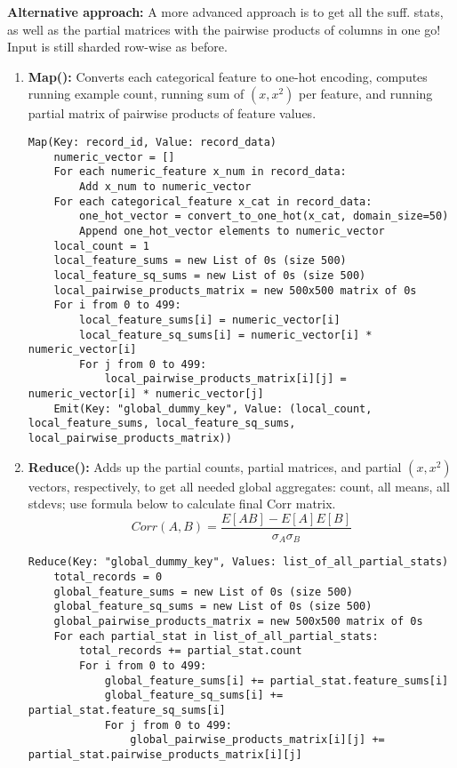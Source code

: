 \documentclass{article}
\begin{document}
\begin{enumerate}[label=\textbf{Question \arabic*.}]
    \textbf{Alternative approach:}
    A more advanced approach is to get all the suff. stats, as well as the partial matrices with the pairwise products of columns in one go! Input is still sharded row-wise as before.
    \begin{enumerate}[label=(\alph*)]
    \item \textbf{Map():} Converts each categorical feature to one-hot encoding, computes running example count, running sum of $(x, x^2)$ per feature, and running partial matrix of pairwise products of feature values.
        \begin{lstlisting}
Map(Key: record_id, Value: record_data)
    numeric_vector = []
    For each numeric_feature x_num in record_data:
        Add x_num to numeric_vector
    For each categorical_feature x_cat in record_data:
        one_hot_vector = convert_to_one_hot(x_cat, domain_size=50)
        Append one_hot_vector elements to numeric_vector
    local_count = 1
    local_feature_sums = new List of 0s (size 500)
    local_feature_sq_sums = new List of 0s (size 500)
    local_pairwise_products_matrix = new 500x500 matrix of 0s
    For i from 0 to 499:
        local_feature_sums[i] = numeric_vector[i]
        local_feature_sq_sums[i] = numeric_vector[i] * numeric_vector[i]
        For j from 0 to 499:
            local_pairwise_products_matrix[i][j] = numeric_vector[i] * numeric_vector[j]
    Emit(Key: "global_dummy_key", Value: (local_count, local_feature_sums, local_feature_sq_sums, local_pairwise_products_matrix))
        \end{lstlisting}
    \item \textbf{Reduce():} Adds up the partial counts, partial matrices, and partial $(x, x^2)$ vectors, respectively, to get all needed global aggregates: count, all means, all stdevs; use formula below to calculate final Corr matrix.
    $$Corr(A,B) = \frac{E[AB] - E[A]E[B]}{\sigma_A \sigma_B}$$
        \begin{lstlisting}
Reduce(Key: "global_dummy_key", Values: list_of_all_partial_stats)
    total_records = 0
    global_feature_sums = new List of 0s (size 500)
    global_feature_sq_sums = new List of 0s (size 500)
    global_pairwise_products_matrix = new 500x500 matrix of 0s
    For each partial_stat in list_of_all_partial_stats:
        total_records += partial_stat.count
        For i from 0 to 499:
            global_feature_sums[i] += partial_stat.feature_sums[i]
            global_feature_sq_sums[i] += partial_stat.feature_sq_sums[i]
            For j from 0 to 499:
                global_pairwise_products_matrix[i][j] += partial_stat.pairwise_products_matrix[i][j]

\end{lstlisting}
\end{enumerate}
\end{enumerate}
\end{document}
